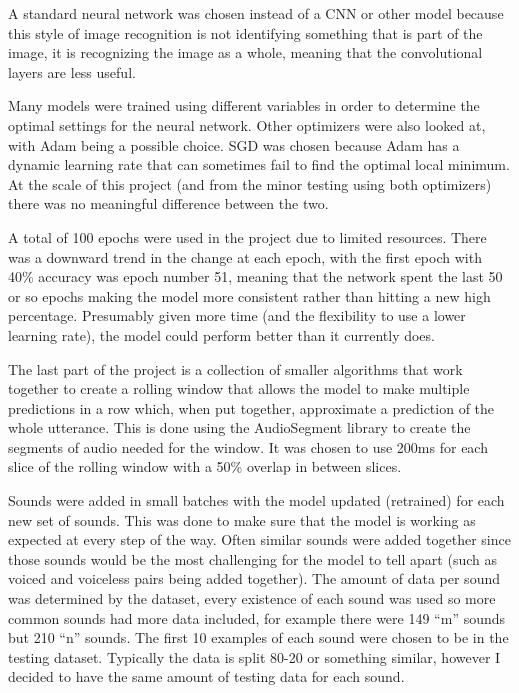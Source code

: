 \documentclass[10pt,twocolumn]{article}
\begin{document}
A standard neural network was chosen instead of a CNN or other model because this style of image recognition is not identifying something that is part of the image, it is recognizing the image as a whole, meaning that the convolutional layers are less useful.

Many models were trained using different variables in order to determine the optimal settings for the neural network. Other optimizers were also looked at, with Adam being a possible choice. SGD was chosen because Adam has a dynamic learning rate that can sometimes fail to find the optimal local minimum. At the scale of this project (and from the minor testing using both optimizers) there was no meaningful difference between the two.

A total of 100 epochs were used in the project due to limited resources. There was a downward trend in the change at each epoch, with the first epoch with 40\% accuracy was epoch number 51, meaning that the network spent the last 50 or so epochs making the model more consistent rather than hitting a new high percentage. Presumably given more time (and the flexibility to use a lower learning rate), the model could perform better than it currently does.

The last part of the project is a collection of smaller algorithms that work together to create a rolling window that allows the model to make multiple predictions in a row which, when put together, approximate a prediction of the whole utterance. This is done using the AudioSegment library to create the segments of audio needed for the window. It was chosen to use 200ms for each slice of the rolling window with a 50\% overlap in between slices. 



Sounds were added in small batches with the model updated (retrained) for each new set of sounds. This was done to make sure that the model is working as expected at every step of the way. Often similar sounds were added together since those sounds would be the most challenging for the model to tell apart (such as voiced and voiceless pairs being added together). The amount of data per sound was determined by the dataset, every existence of each sound was used so more common sounds had more data included, for example there were 149 “m” sounds but 210 “n” sounds. The first 10 examples of each sound were chosen to be in the testing dataset. Typically the data is split 80-20 or something similar, however I decided to have the same amount of testing data for each sound.
\end{document}
